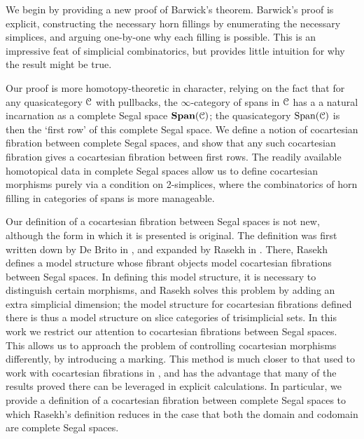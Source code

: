 \documentclass[main.tex]{subfiles}
\begin{document}
We begin by providing a new proof of Barwick's theorem. Barwick's proof is explicit, constructing the necessary horn fillings by enumerating the necessary simplices, and arguing one-by-one why each filling is possible. This is an impressive feat of simplicial combinatorics, but provides little intuition for why the result might be true.

Our proof is more homotopy-theoretic in character, relying on the fact that for any quasicategory $\mathcal{C}$ with pullbacks, the $\infty$-category of spans in $\mathcal{C}$ has a a natural incarnation as a complete Segal space $\mathbf{Span}(\mathcal{C})$; the quasicategory $\mathrm{Span}(\mathcal{C})$ is then the `first row' of this complete Segal space. We define a notion of cocartesian fibration between complete Segal spaces, and show that any such cocartesian fibration gives a cocartesian fibration between first rows. The readily available homotopical data in complete Segal spaces allow us to define cocartesian morphisms purely via a condition on 2-simplices, where the combinatorics of horn filling in categories of spans is more manageable.

Our definition of a cocartesian fibration between Segal spaces is not new, although the form in which it is presented is original. The definition was first written down by De Brito in \cite{2016arXiv160500706B}, and expanded by Rasekh in \cite{rasekhcartesianfibrations}. There, Rasekh defines a model structure whose fibrant objects model cocartesian fibrations between Segal spaces. In defining this model structure, it is necessary to distinguish certain morphisms, and Rasekh solves this problem by adding an extra simplicial dimension; the model structure for cocartesian fibrations defined there is thus a model structure on slice categories of trisimplicial sets. In this work we restrict our attention to cocartesian fibrations between Segal spaces. This allows us to approach the problem of controlling cocartesian morphisms differently, by introducing a marking. This method is much closer to that used to work with cocartesian fibrations in \cite{highertopostheory}, and has the advantage that many of the results proved there can be leveraged in explicit calculations. In particular, we provide a definition of a cocartesian fibration between complete Segal spaces to which Rasekh's definition reduces in the case that both the domain and codomain are complete Segal spaces.
\end{document}
